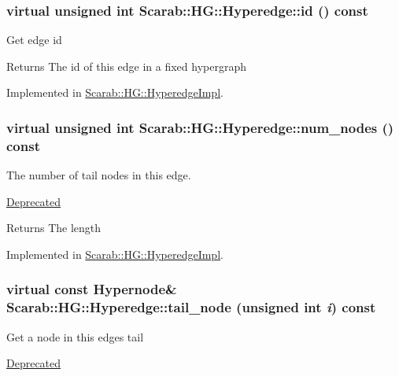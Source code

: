 \hypertarget{classScarab_1_1HG_1_1Hyperedge_af824beb7107253a7545b35992c17e057}{
\subsubsection[{id}]{\setlength{\rightskip}{0pt plus 5cm}virtual unsigned int Scarab::HG::Hyperedge::id () const}}
\label{classScarab_1_1HG_1_1Hyperedge_af824beb7107253a7545b35992c17e057}
Get edge id

\begin{DoxyReturn}{Returns}
The id of this edge in a fixed hypergraph 
\end{DoxyReturn}


Implemented in \hyperlink{classScarab_1_1HG_1_1HyperedgeImpl_afa81943347267781c25c4e68f7f5f547}{Scarab::HG::HyperedgeImpl}.

\hypertarget{classScarab_1_1HG_1_1Hyperedge_a799d8d98242c129d7eee178bdf1fb535}{
\subsubsection[{num\_\-nodes}]{\setlength{\rightskip}{0pt plus 5cm}virtual unsigned int Scarab::HG::Hyperedge::num\_\-nodes () const}}
\label{classScarab_1_1HG_1_1Hyperedge_a799d8d98242c129d7eee178bdf1fb535}
The number of tail nodes in this edge. \begin{Desc}
\item[\hyperlink{deprecated__deprecated000004}{Deprecated}]\end{Desc}
\begin{DoxyReturn}{Returns}
The length 
\end{DoxyReturn}


Implemented in \hyperlink{classScarab_1_1HG_1_1HyperedgeImpl_a9a5bef8789c9c7caee6f53833ea4acc7}{Scarab::HG::HyperedgeImpl}.

\hypertarget{classScarab_1_1HG_1_1Hyperedge_a9ec8cf9ea7b5f762f359a6f9f1c038da}{
\subsubsection[{tail\_\-node}]{\setlength{\rightskip}{0pt plus 5cm}virtual const {\bf Hypernode}\& Scarab::HG::Hyperedge::tail\_\-node (unsigned int {\em i}) const}}
\label{classScarab_1_1HG_1_1Hyperedge_a9ec8cf9ea7b5f762f359a6f9f1c038da}
Get a node in this edges tail \begin{Desc}
\item[\hyperlink{deprecated__deprecated000003}{Deprecated}]\end{Desc}


